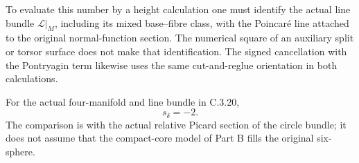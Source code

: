 \begin{remark}[Scope]
To evaluate this number by a height calculation one must identify
the actual line bundle $\mathcal L|_M$, including its mixed
base--fibre class, with the Poincar\'e line attached to the
original normal-function section. The numerical square of an
auxiliary split or torsor surface does not make that
identification. The signed cancellation with the Pontryagin
term likewise uses the same cut-and-reglue orientation in both
calculations.
\end{remark}
\begin{proposition}
For the actual four-manifold and line bundle in C.3.20,
\[
 s_\delta=-2.
\]
The comparison is with the actual relative Picard section of
the circle bundle; it does not assume that the compact-core
model of Part B fills the original six-sphere.
\end{proposition}
